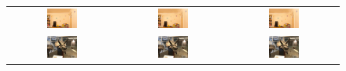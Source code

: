 \documentclass[12pt]{report}
\begin{document}
\begin{figure}[h]
\begin{tabular}{ccc}
        \includegraphics[width=0.3\textwidth]{../o-3dgs/eval/playroom/test/ours_30000/gt/00000.png} & 
        \includegraphics[width=0.3\textwidth]{../o-3dgs/eval/playroom/test/ours_30000/renders/00000.png} & 
        \includegraphics[width=0.3\textwidth]{../o-3dgs/eval/playroom/test/ours_30000/renders/00000.png} \\
        \includegraphics[width=0.3\textwidth]{../o-3dgs/eval/horns/test/ours_30000/gt/00000.png} & 
        \includegraphics[width=0.3\textwidth]{../o-3dgs/eval/horns/test/ours_30000/renders/00000.png} & 
        \includegraphics[width=0.3\textwidth]{../o-3dgs/eval/horns/test/ours_30000/renders/00000.png} \\

\end{tabular}
\end{figure}
\end{document}
